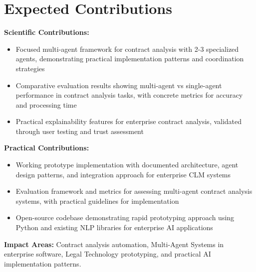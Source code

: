 
\section{Expected Contributions}\label{section:expected_contributions}

\textbf{Scientific Contributions:}
\begin{itemize}
    \item Focused multi-agent framework for contract analysis with 2-3 specialized agents, demonstrating practical implementation patterns and coordination strategies
    \item Comparative evaluation results showing multi-agent vs single-agent performance in contract analysis tasks, with concrete metrics for accuracy and processing time
    \item Practical explainability features for enterprise contract analysis, validated through user testing and trust assessment
\end{itemize}

\textbf{Practical Contributions:}
\begin{itemize}
    \item Working prototype implementation with documented architecture, agent design patterns, and integration approach for enterprise CLM systems
    \item Evaluation framework and metrics for assessing multi-agent contract analysis systems, with practical guidelines for implementation
    \item Open-source codebase demonstrating rapid prototyping approach using Python and existing NLP libraries for enterprise AI applications
\end{itemize}

\textbf{Impact Areas:} Contract analysis automation, Multi-Agent Systems in enterprise software, Legal Technology prototyping, and practical AI implementation patterns.
